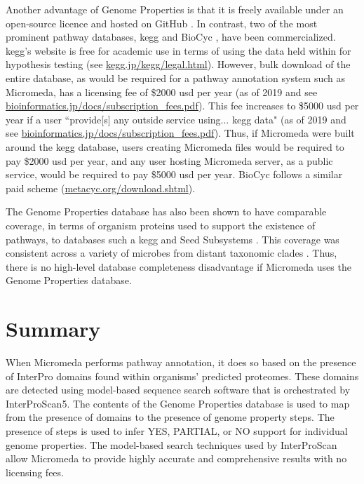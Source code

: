Another advantage of Genome Properties is that it is freely available under an 
open-source licence and hosted on GitHub \cite{richardson2018genome}. In 
contrast, two of the most prominent pathway databases, \gls{kegg} and BioCyc 
\cite{karp2005expansion}, have been commercialized. \gls{kegg}'s website is free 
for academic use in terms of using the data held within for hypothesis testing 
(see \href{http://www.kegg.jp/kegg/legal.html}{kegg.jp/kegg/legal.html}). 
However, bulk download of the entire database, as would be required for a 
pathway annotation system such as Micromeda, has a licensing fee of \$2000 
\gls{usd} per year (as of 2019 and see 
\href{https://www.bioinformatics.jp/docs/subscription_fees.pdf}{bioinformatics.jp/docs/subscription\_fees.pdf}). 
This fee increases to \$5000 \gls{usd} per year if a user ``provide[s] any 
outside service using... \gls{kegg} data" (as of 2019 and see 
\href{https://www.bioinformatics.jp/docs/subscription_fees.pdf}{bioinformatics.jp/docs/subscription\_fees.pdf}). 
Thus, if Micromeda were built around the \gls{kegg} database, users creating 
Micromeda files would be required to pay \$2000 \gls{usd} per year, and any user 
hosting Micromeda server, as a public service, would be required to pay \$5000 
\gls{usd} per year. BioCyc follows a similar paid scheme 
(\href{http://metacyc.org/download.shtml}{metacyc.org/download.shtml}). 

The Genome Properties database has also been shown to have comparable coverage, 
in terms of organism proteins used to support the existence of pathways, to 
databases such a \gls{kegg} and Seed Subsystems \cite{richardson2018genome}. 
This coverage was consistent across a variety of microbes from distant taxonomic 
clades \cite{richardson2018genome}. Thus, there is no high-level database 
completeness disadvantage if Micromeda uses the Genome Properties database. 

\section{Summary}

When Micromeda performs pathway annotation, it does so based on the presence of 
InterPro domains found within organisms' predicted proteomes. These domains are 
detected using model-based sequence search software that is orchestrated by 
InterProScan5. The contents of the Genome Properties database is used to map 
from the presence of domains to the presence of genome property steps. The 
presence of steps is used to infer YES, PARTIAL, or NO support for individual 
genome properties. The model-based search techniques used by InterProScan allow 
Micromeda to provide highly accurate and comprehensive results with no licensing 
fees.
